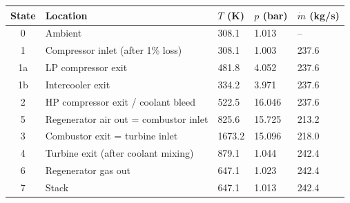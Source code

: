 \begin{tabular}{cllll}\toprule State & Location & $T$ (K) & $p$ (bar) & $\dot m$ (kg/s)\\\midrule
0 & Ambient & 308.1 & 1.013 & --\\
1 & Compressor inlet (after 1\% loss) & 308.1 & 1.003 & 237.6\\
1a & LP compressor exit & 481.8 & 4.052 & 237.6\\
1b & Intercooler exit & 334.2 & 3.971 & 237.6\\
2 & HP compressor exit / coolant bleed & 522.5 & 16.046 & 237.6\\
5 & Regenerator air out = combustor inlet & 825.6 & 15.725 & 213.2\\
3 & Combustor exit = turbine inlet & 1673.2 & 15.096 & 218.0\\
4 & Turbine exit (after coolant mixing) & 879.1 & 1.044 & 242.4\\
6 & Regenerator gas out & 647.1 & 1.023 & 242.4\\
7 & Stack & 647.1 & 1.013 & 242.4\\
\bottomrule\end{tabular}